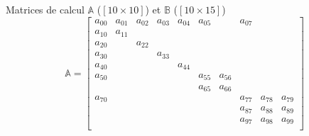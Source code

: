 \documentclass[11pt]{article}
\begin{document}
        Matrices de calcul $\mathbb{A}$ ($[10\times 10]$) et $\mathbb{B}$ ($[10\times 15]$)
        \begin{equation}\label{eq:rcmatrix}
        \mathbb{A} = 
        \begin{bmatrix}
          a_{00} & a_{01} & a_{02} & a_{03} & a_{04} & a_{05} &        & a_{07} &        &       \\
          a_{10} & a_{11} &        &        &        &        &        &        &        &       \\
          a_{20} &        & a_{22} &        &        &        &        &        &        &       \\
          a_{30} &        &        & a_{33} &        &        &        &        &        &       \\
          a_{40} &        &        &        & a_{44} &        &        &        &        &       \\
          a_{50} &        &        &        &        & a_{55} & a_{56} &        &        &       \\
                 &        &        &        &        & a_{65} & a_{66} &        &        &       \\
          a_{70} &        &        &        &        &        &        & a_{77} & a_{78} & a_{79}\\
                 &        &        &        &        &        &        & a_{87} & a_{88} & a_{89}\\
                 &        &        &        &        &        &        & a_{97} & a_{98} & a_{99}\\
        \end{bmatrix}
        \end{equation}
\end{document}
